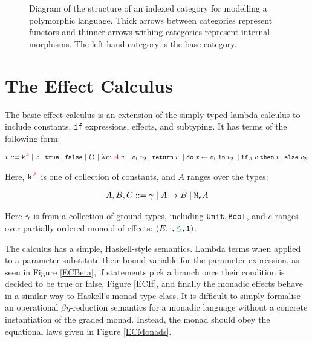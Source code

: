 \documentclass{Report}
\begin{document}
\begin{figure}[ht!]
{
    }
    
    \caption{Diagram of the structure of an indexed category for modelling a polymorphic language. Thick arrows between categories represent functors and thinner arrows withing categories represent internal morphisms. The left-hand category is the base category.
    }
    \label{IndexDiagram}
\end{figure}


\section{The Effect Calculus}
\label{ECDefinition}
The basic effect calculus is an extension of the simply typed lambda calculus to include constants, \texttt{if} expressions, effects, and subtyping. It has terms of the following form:

\begin{align*}
    v ::= \texttt{k}^{\color{purple} A} \mid x\mid \texttt{true} \mid\texttt{false} \mid\texttt{()}\mid\lambda x \colon {\color{purple}A}. v\;\mid v_1\; v_2\mid\texttt{return} \; v\;\mid\texttt{do}\; x \leftarrow v_1 \;\texttt{in}\; v_2\;\mid\texttt{if}_{\textcolor{purple}{A}}\; v\; \texttt{then}\; v_1 \;\texttt{else} \; v_2\; 
\end{align*}

Here, $\texttt{k}^{\color{purple} A}$ is one of collection of constants, and $A$ ranges over the types:

\begin{align*}
    A, B, C ::= \gamma\mid A\rightarrow B \mid\texttt{M}_{e}{A}
\end{align*}

Here $\gamma$ is from a collection of ground types, including $\texttt{Unit}, \texttt{Bool}$, and $e$ ranges over partially ordered monoid of effects: $(E, \dot, \subeffect, \1)$.

The calculus has a simple, Haskell-style semantics. Lambda terms when applied to a parameter substitute their bound variable for the parameter expression, as seen in Figure \ref{ECBeta}, if statements pick a branch once their condition is decided to be true or false, Figure \ref{ECIf}, and finally the monadic effects behave in a similar way to Haskell's monad type class. It is difficult to simply formalise an operational $\beta\eta$-reduction semantics for a monadic language without a concrete instantiation of the graded monad. Instead, the monad should obey the equational laws given in Figure \ref{ECMonads}.
\end{document}
